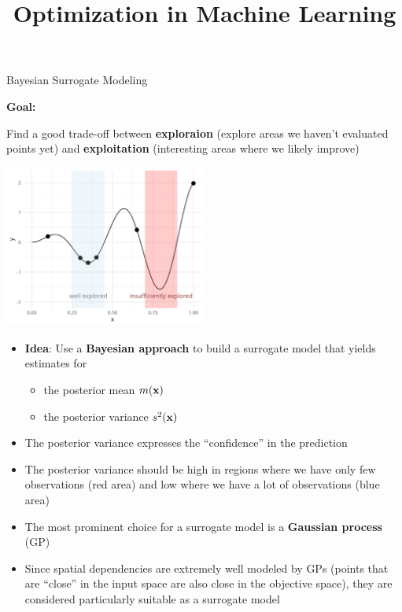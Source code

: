 \documentclass[11pt,compress,t,notes=noshow, xcolor=table]{beamer}
\title{Optimization in Machine Learning}
\date{}
\begin{document}


\begin{vbframe}{Bayesian Surrogate Modeling}

\textbf{Goal:}

Find a good trade-off between \textbf{exploraion} (explore areas we haven't evaluated points yet) and \textbf{exploitation} (interesting areas where we likely improve)

\vspace{+.45cm}

\begin{center}
  \includegraphics[width = 0.5\textwidth]{figure_man/bayesian_loop_0.png}
\end{center}

\framebreak 

\begin{itemize}
\item \textbf{Idea}: Use a \textbf{Bayesian approach} to build a surrogate model that yields estimates for 
\begin{itemize}
  \item the posterior mean $m(\mathbf{x})$
  \item the posterior variance $ s^2(\mathbf{x})$
\end{itemize}
\item The posterior variance expresses the \enquote{confidence} in the prediction
\item The posterior variance should be high in regions where we have only few observations (red area) and low where we have a lot of observations (blue area)
\item The most prominent choice for a surrogate model is a \textbf{Gaussian process} (GP)
\item Since spatial dependencies are extremely well modeled by GPs (points that are \enquote{close} in the input space are also close in the objective space), they are considered particularly suitable as a surrogate model
\end{itemize}

\end{vbframe} 
\end{document}
